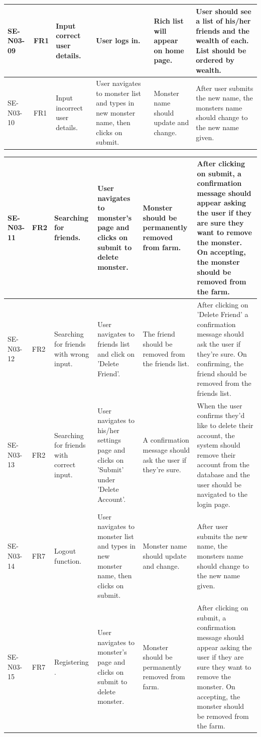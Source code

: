 \documentclass[a4paper]{article}
\begin{document}
\begin{landscape}
\begin{center}
\begin{tabular}{| l | l | p{3cm} | p{3cm} | p{5cm} | p{7cm} |}
	\hline
	SE-N03-09 & FR1 & Input correct user details. & User logs in. & Rich list will appear on home page. & User should see a list of his/her friends and the wealth of each. List should be ordered by wealth.\\
	\hline
	SE-N03-10 & FR1 & Input incorrect user details. & User navigates to monster list and types in new monster name, then clicks on submit. & Monster name should update and change. & After user submits the new name, the monsters name should change to the new name given.\\
	\hline
\end{tabular}
\end{center}

\clearpage

\begin{center}
\thispagestyle{empty}
	\begin{tabular}{| l | l | p{3cm} | p{3cm} | p{5cm} | p{7cm} |}
	\hline
	SE-N03-11 & FR2 & Searching for friends. & User navigates to monster's page and clicks on submit to delete monster. & Monster should be permanently removed from farm. & After clicking on submit, a confirmation message should appear asking the user if they are sure they want to remove the monster. On accepting, the monster should be removed from the farm.\\
	\hline
	SE-N03-12 & FR2 & Searching for friends with wrong input. & User navigates to friends list and click on 'Delete Friend'. & The friend should be removed from the friends list. & After clicking on 'Delete Friend' a confirmation message should ask the user if they're sure. On confirming, the friend should be removed from the friends list.\\
	\hline
	SE-N03-13 & FR2 & Searching for friends with correct input. & User navigates to his/her settings page and clicks on 'Submit' under 'Delete Account'. & A confirmation message should ask the user if they're sure. & When the user confirms they'd like to delete their account, the system should remove their account from the database and the user should be navigated to the login page.\\
	\hline
	SE-N03-14 & FR7 & Logout function. & User navigates to monster list and types in new monster name, then clicks on submit. & Monster name should update and change. & After user submits the new name, the monsters name should change to the new name given.\\
	\hline
	SE-N03-15 & FR7 & Registering . & User navigates to monster's page and clicks on submit to delete monster. & Monster should be permanently removed from farm. & After clicking on submit, a confirmation message should appear asking the user if they are sure they want to remove the monster. On accepting, the monster should be removed from the farm.\\

\end{tabular}
\end{center}
\end{landscape}
\end{document}

